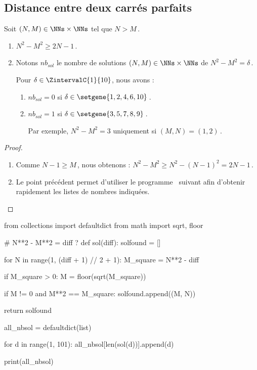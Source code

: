 

\subsection{Distance entre deux carrés parfaits}

\begin{fact} \label{diff-square-ko}
	Soit $(N, M) \in \NNs \times \NNs$ tel que $N > M$\,.
	\begin{enumerate}
		\item $N^2 - M^2 \geq 2N - 1$\,.
		
		\item Notons $nb_{sol}$ le nombre de solutions $(N, M) \in \NNs \times \NNs$ de $N^2 - M^2 = \delta$\,.
		
		\smallskip
		\noindent
		Pour $\delta \in \ZintervalC{1}{10}$, nous avons :
		\begin{enumerate}
			\item $nb_{sol}= 0$ si $\delta \in \setgene{1, 2, 4, 6, 10}$\,.

			\item $nb_{sol}= 1$ si $\delta \in \setgene{3, 5, 7, 8, 9}$\,.
			
			\noindent
			Par exemple, $N^2 - M^2 = 3$ uniquement si $(M, N) = (1, 2)$\,.
		\end{enumerate}
	\end{enumerate}
\end{fact}



\begin{proof}
	\leavevmode
	
	\vspace{-1ex}
	\begin{enumerate}
		\item Comme $N - 1 \geq M$\,, nous obtenons :
		$N^2 - M^2 \geq N^2 - (N - 1)^2 = 2N - 1$\,.

		\item Le point précédent permet d'utiliser le programme \python\ suivant afin d'obtenir rapidement les listes de nombres indiquées.
		\qedhere
	\end{enumerate}
\end{proof}

\bgroup
\small
\begin{Python}
from collections import defaultdict
from math        import sqrt, floor

# N**2 - M**2 = diff ?
def sol(diff):
    solfound = []

    for N in range(1, (diff + 1) // 2 + 1):
        M_square = N**2 - diff

        if M_square > 0:
            M = floor(sqrt(M_square))

            if M != 0 and M**2 == M_square:
                solfound.append((M, N))

    return solfound

all_nbsol = defaultdict(list)

for d in range(1, 101):
    all_nbsol[len(sol(d))].append(d)

print(all_nbsol)
\end{Python}
\egroup


